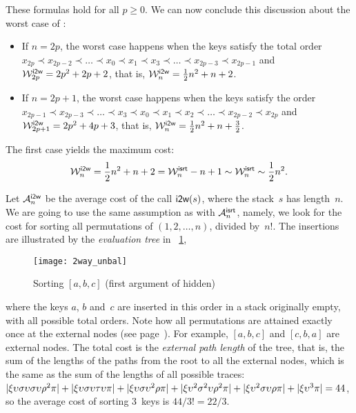 These formulas hold for all \(p \geqslant 0\). We can now conclude
this discussion about the worst case of :
\begin{itemize}

\item If \(n = 2p\), the worst case happens when the keys satisfy the
  total order \(x_{2p} \prec x_{2p-2} \prec \dots \prec x_0 \prec x_1
  \prec x_3 \prec \dots \prec x_{2p-3} \prec x_{2p-1}\) and
  \(\W{\fun{i2w}}{2p} = 2p^2 + 2p + 2\), that is, \(\W{\fun{i2w}}{n} =
  \frac{1}{2}{n^2} + n + 2\).

\item If \(n = 2p+1\), the worst case happens when the keys satisfy
  the order \(x_{2p-1} \prec x_{2p-3} \prec \dots \prec x_3 \prec x_0
  \prec x_1 \prec x_2 \prec \dots \prec x_{2p-2} \prec x_{2p}\) and
  \(\W{\fun{i2w}}{2p+1} = 2p^2 + 4p + 3\), that is, \(\W{\fun{i2w}}{n}
  = \frac{1}{2}{n^2} + n + \frac{3}{2}\).

\end{itemize}
The first case yields the maximum cost:
\begin{equation*}
\belowdisplayskip=0pt
  \W{\fun{i2w}}{n} = \frac{1}{2}{n^2} + n + 2 = \W{\fun{isrt}}{n} - n
  + 1 \sim
  \W{\fun{isrt}}{n} \sim \frac{1}{2}{n^2}.
\end{equation*}



Let \(\M{\fun{i2w}}{n}\) be the average
cost of the call \(\fun{i2w}(s)\), where the
stack~\(s\) has length~\(n\). We are going to use the same assumption
as with \(\M{\fun{isrt}}{n}\), namely, we look for the cost for
sorting all permutations of \((1,2,\dots,n)\), divided by~\(n!\). The
insertions are illustrated by the \emph{evaluation
  tree} in \fig~\ref{fig:2way_unbal},
\begin{figure}[t]
\centering
\texttt{[image: 2way\_unbal]}
\caption{Sorting \([a,b,c]\) (first argument of  hidden)
\label{fig:2way_unbal}}
\end{figure}
where the keys \(a\), \(b\) and~\(c\) are inserted in this order in a
stack originally empty, with all possible total orders. Note how all
permutations are attained exactly once at the external
nodes (see
page~\pageref{def:external_node}). For example, \([a,b,c]\) and
\([c,b,a]\) are external nodes. The total cost is the \emph{external
  path length}\label{external_path_length} of the tree, that is, the sum of
the lengths of the paths from the root to all the external nodes,
which is the same as the sum of the lengths of all possible
traces:
\(\len{\xi\upsilon\sigma\upsilon\sigma\upsilon\rho^2\pi} +
\len{\xi\upsilon\sigma\upsilon\tau\upsilon\pi} +
\len{\xi\upsilon\sigma\upsilon^2\rho\pi} +
\len{\xi\upsilon^2\sigma^2\upsilon\rho^2\pi} +
\len{\xi\upsilon^2\sigma\upsilon\rho\pi} + \len{\xi\upsilon^3\pi} =
44\), so the average cost of sorting \(3\)~keys is \(44/3! = 22/3\).

